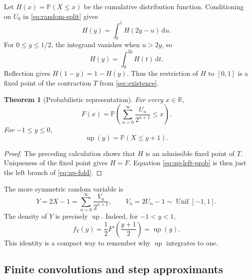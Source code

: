 \documentclass[11pt,oneside]{article}
\newtheorem{theorem}{Theorem}[section]
\theoremstyle{definition}
\theoremstyle{remark}
\newcommand{\R}{\mathbb R}
\newcommand{\Up}{\operatorname{up}}
\newcommand{\dd}{\,\mathrm d}
\newcommand{\Prob}{\mathbb P}
\begin{document}
Let $H(x)=\Prob(X\le x)$ be the cumulative distribution function.  Conditioning on $U_0$
in \eqref{eq:random-split} gives
\begin{equation}
 H(y)=\int_0^1 H(2y-u)\dd u.                               \label{eq:CDF-smoothing}
\end{equation}
For $0\le y\le1/2$, the integrand vanishes when $u>2y$, so
\begin{equation}
 H(y)=\int_0^{2y}H(t)\dd t.                                \label{eq:CDF-left}
\end{equation}
Reflection gives $H(1-y)=1-H(y)$.  Thus the restriction of $H$ to $[0,1]$ is a fixed point
of the contraction $T$ from \cref{sec:existence}.

\begin{theorem}[Probabilistic representation]
For every $x\in\R$,
\begin{equation}
 F(x)=\Prob\left(\sum_{n=0}^{\infty}\frac{U_n}{2^{n+1}}\le x\right). \label{eq:F-CDF}
\end{equation}
For $-1\le y\le0$,
\begin{equation}
 \Up(y)=\Prob(X\le y+1).                                  \label{eq:up-left-prob}
\end{equation}
\end{theorem}

\begin{proof}
The preceding calculation shows that $H$ is an admissible fixed point of $T$.  Uniqueness of
the fixed point gives $H=F$.  Equation \eqref{eq:up-left-prob} is then just the left branch
of \eqref{eq:up-fold}.
\end{proof}

The more symmetric random variable is
\begin{equation}
 Y=2X-1=\sum_{n=0}^{\infty}\frac{V_n}{2^{n+1}},
 \qquad V_n=2U_n-1\sim\operatorname{Unif}[-1,1].           \label{eq:random-Y}
\end{equation}
The density of $Y$ is precisely $\Up$.  Indeed, for $-1<y<1$,
\begin{equation}
 f_Y(y)=\frac12F'\!\left(\frac{y+1}{2}\right)=\Up(y).     \label{eq:up-density}
\end{equation}
This identity is a compact way to remember why $\Up$ integrates to one.

\subsection{Finite convolutions and step approximants}
\end{document}
